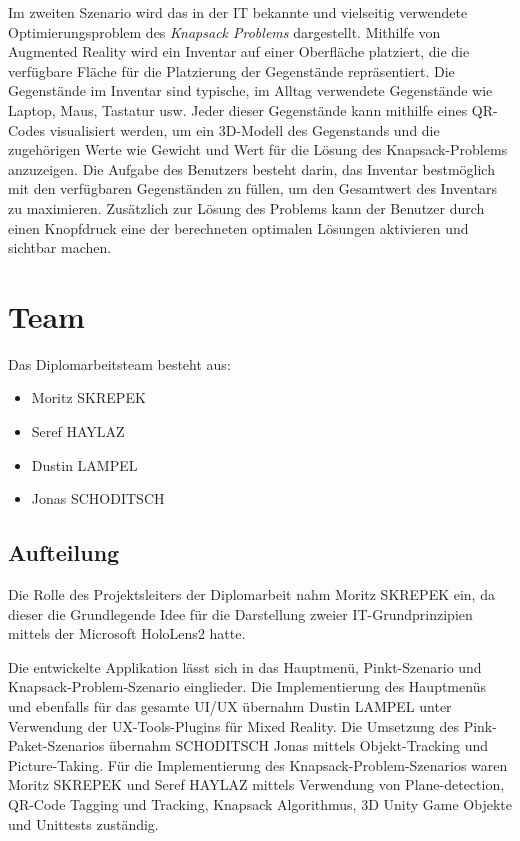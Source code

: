 Im zweiten Szenario wird das in der IT bekannte und vielseitig verwendete Optimierungsproblem des \textit{Knapsack Problems}
dargestellt. Mithilfe von Augmented Reality wird ein Inventar auf einer Oberfläche platziert, die die verfügbare Fläche für
die Platzierung der Gegenstände repräsentiert. Die Gegenstände im Inventar sind typische, im Alltag verwendete Gegenstände
wie Laptop, Maus, Tastatur usw. Jeder dieser Gegenstände kann mithilfe eines QR-Codes visualisiert werden, um ein 3D-Modell
des Gegenstands und die zugehörigen Werte wie Gewicht und Wert für die Lösung des Knapsack-Problems anzuzeigen. Die Aufgabe
des Benutzers besteht darin, das Inventar bestmöglich mit den verfügbaren Gegenständen zu füllen, um den Gesamtwert des
Inventars zu maximieren. Zusätzlich zur Lösung des Problems kann der Benutzer durch einen Knopfdruck eine der berechneten
optimalen Lösungen aktivieren und sichtbar machen.

\section{Team}
Das Diplomarbeitsteam besteht aus:
\begin{itemize}
    \item Moritz SKREPEK
    \item Seref HAYLAZ
    \item Dustin LAMPEL
    \item Jonas SCHODITSCH
\end{itemize}

\subsection{Aufteilung}
Die Rolle des Projektsleiters der Diplomarbeit nahm Moritz SKREPEK ein, da dieser die Grundlegende Idee für die Darstellung
zweier IT-Grundprinzipien mittels der Microsoft HoloLens2 hatte.

Die entwickelte Applikation lässt sich in das Hauptmenü, Pinkt-Szenario und Knapsack-Problem-Szenario einglieder. Die Implementierung
des Hauptmenüs und ebenfalls für das gesamte UI/UX übernahm Dustin LAMPEL unter Verwendung der UX-Tools-Plugins für Mixed Reality.
Die Umsetzung des Pink-Paket-Szenarios übernahm SCHODITSCH Jonas mittels Objekt-Tracking und Picture-Taking. Für die Implementierung des
Knapsack-Problem-Szenarios waren Moritz SKREPEK und Seref HAYLAZ mittels Verwendung von Plane-detection,
QR-Code Tagging und Tracking, Knapsack Algorithmus, 3D Unity Game Objekte und Unittests zuständig.



